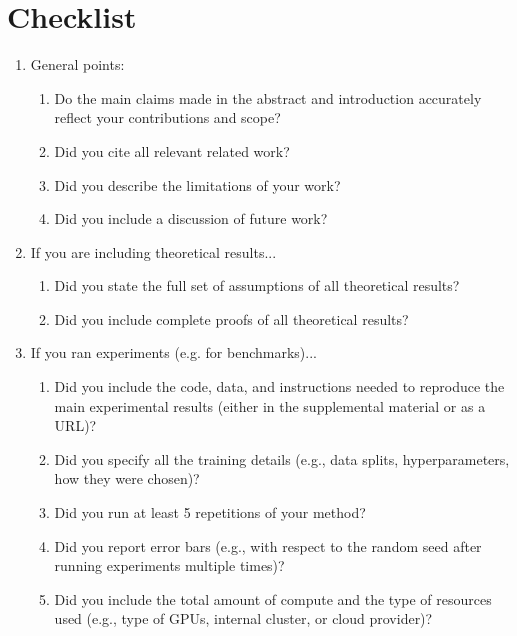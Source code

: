 \documentclass{article}
\begin{document}
\newpage



\newpage
\section*{Checklist}
\begin{enumerate}

\item General points:
\begin{enumerate}
  \item Do the main claims made in the abstract and introduction accurately reflect your contributions and scope?
    \answerYes{}
  \item Did you cite all relevant related work?
    \answerYes{}
  \item Did you describe the limitations of your work?
    \answerYes{}
  \item Did you include a discussion of future work?
    \answerYes{}
\end{enumerate}

\item If you are including theoretical results...
\begin{enumerate}
  \item Did you state the full set of assumptions of all theoretical results?
    \answerNA{}
	\item Did you include complete proofs of all theoretical results?
    \answerNA{}
\end{enumerate}

\item If you ran experiments (e.g. for benchmarks)...
\begin{enumerate}
  \item Did you include the code, data, and instructions needed to reproduce the main experimental results (either in the supplemental material or as a URL)?
    \answerYes{}
  \item Did you specify all the training details (e.g., data splits, hyperparameters, how they were chosen)?
    \answerYes{}
  \item Did you run at least 5 repetitions of your method?
    \answerYes{}
  \item Did you report error bars (e.g., with respect to the random seed after running experiments multiple times)?
    \answerYes{}
  \item Did you include the total amount of compute and the type of resources used (e.g., type of GPUs, internal cluster, or cloud provider)?
    \answerYes{}
\end{enumerate}


\end{enumerate}
\end{document}
